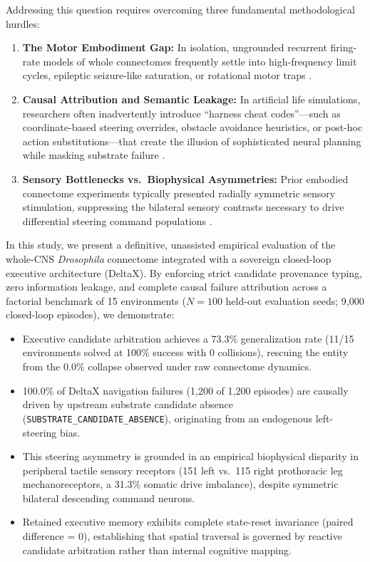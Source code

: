 \documentclass[10pt,letterpaper]{article}
\begin{document}
Addressing this question requires overcoming three fundamental methodological hurdles:
\begin{enumerate}
    \item \textbf{The Motor Embodiment Gap:} In isolation, ungrounded recurrent firing-rate models of whole connectomes frequently settle into high-frequency limit cycles, epileptic seizure-like saturation, or rotational motor traps \cite{pugliese2025whole}.
    \item \textbf{Causal Attribution and Semantic Leakage:} In artificial life simulations, researchers often inadvertently introduce ``harness cheat codes''---such as coordinate-based steering overrides, obstacle avoidance heuristics, or post-hoc action substitutions---that create the illusion of sophisticated neural planning while masking substrate failure \cite{milo2002network}.
    \item \textbf{Sensory Bottlenecks vs.\ Biophysical Asymmetries:} Prior embodied connectome experiments typically presented radially symmetric sensory stimulation, suppressing the bilateral sensory contrasts necessary to drive differential steering command populations \cite{rayshubskiy2020neural, bidaye2020locomotor}.
\end{enumerate}

In this study, we present a definitive, unassisted empirical evaluation of the whole-CNS \textit{Drosophila} connectome integrated with a sovereign closed-loop executive architecture (DeltaX). By enforcing strict candidate provenance typing, zero information leakage, and complete causal failure attribution across a factorial benchmark of 15 environments ($N = 100$ held-out evaluation seeds; 9,000 closed-loop episodes), we demonstrate:
\begin{itemize}
    \item Executive candidate arbitration achieves a 73.3\% generalization rate (11/15 environments solved at 100\% success with 0 collisions), rescuing the entity from the 0.0\% collapse observed under raw connectome dynamics.
    \item 100.0\% of DeltaX navigation failures (1,200 of 1,200 episodes) are causally driven by upstream substrate candidate absence (\texttt{SUBSTRATE\_CANDIDATE\_ABSENCE}), originating from an endogenous left-steering bias.
    \item This steering asymmetry is grounded in an empirical biophysical disparity in peripheral tactile sensory receptors (151 left vs.\ 115 right prothoracic leg mechanoreceptors, a 31.3\% somatic drive imbalance), despite symmetric bilateral descending command neurons.
    \item Retained executive memory exhibits complete state-reset invariance (paired difference = 0), establishing that spatial traversal is governed by reactive candidate arbitration rather than internal cognitive mapping.
\end{itemize}
\end{document}
